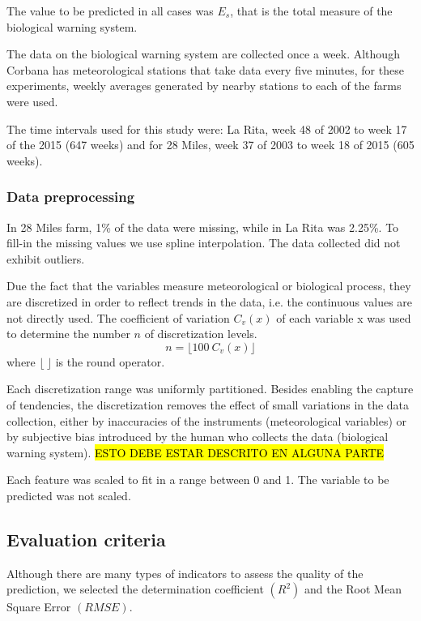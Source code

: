 \documentclass[review]{elsarticle}
\begin{document}
The value to be predicted in all cases was $E_s$, that is the total measure of the biological warning system.  

The data on the biological warning system are collected once a week. Although Corbana has meteorological stations that take data every five minutes, for these experiments, weekly averages generated by nearby stations to each of the farms were used.

The time intervals used for this study were: La Rita, week 48 of 2002 to week 17 of the 2015 (647 weeks) and for 28 Miles, week 37 of 2003 to week 18 of 2015 (605 weeks).

\subsubsection{Data preprocessing}

In 28 Miles farm, 1\% of the data were missing, while in La Rita was 2.25\%. To fill-in the missing values we use spline interpolation. The data collected did not exhibit outliers.

Due the fact that the variables measure meteorological or biological process, they are discretized in order to reflect trends in the data, i.e. the continuous values are not directly used. The coefficient of variation $C_v(x)$ of each variable x was used to determine the number $n$ of discretization levels.
$$n= \lfloor 100 \ C_v(x) \rfloor$$
where $\lfloor \ \rfloor$  is the round operator.

Each discretization range was uniformly partitioned. Besides enabling the capture of tendencies, the discretization removes the effect of small variations in the data collection, either by inaccuracies of the instruments (meteorological variables) or by subjective bias introduced by the human who collects the data (biological warning system). \hl{ESTO DEBE ESTAR DESCRITO EN ALGUNA PARTE}

Each feature was scaled to fit in a range between 0 and 1. The variable to be predicted was not scaled.

\subsection{Evaluation criteria}

Although there are many types of indicators to assess the quality of the prediction, we selected the determination coefficient $(R^2)$ and the Root Mean Square Error $(RMSE)$.  
\end{document}
